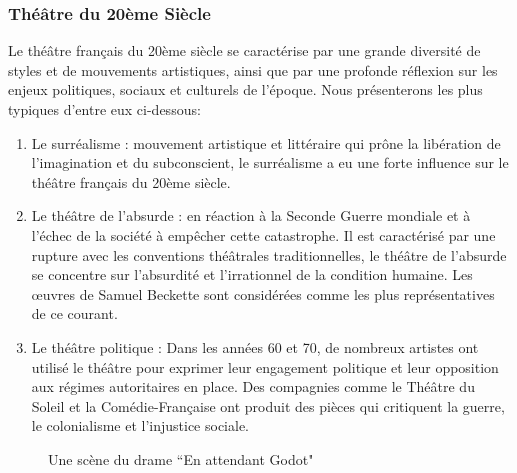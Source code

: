 \documentclass[UTF8,a4paper,12pt]{ctexart}
\numberwithin{equation}{section}
\newcommand{\mycite}[1]{\cite{#1}}
\begin{document}
\subsubsection{Théâtre du 20ème Siècle}
Le théâtre français du 20ème siècle se caractérise par une grande diversité de styles et de mouvements artistiques, ainsi que par une profonde réflexion sur les enjeux politiques, sociaux et culturels de l'époque. Nous présenterons les plus typiques d'entre eux ci-dessous:
\begin{enumerate}
\item Le surréalisme : mouvement artistique et littéraire qui prône la libération de l'imagination et du subconscient, le surréalisme a eu une forte influence sur le théâtre français du 20ème siècle.

\item Le théâtre de l'absurde : en réaction à la Seconde Guerre mondiale et à l'échec de la société à empêcher cette catastrophe. Il est caractérisé par une rupture avec les conventions théâtrales traditionnelles, le théâtre de l'absurde se concentre sur l'absurdité et l'irrationnel de la condition humaine. Les œuvres de Samuel Beckette sont considérées comme les plus représentatives de ce courant.

\item Le théâtre politique : Dans les années 60 et 70, de nombreux artistes ont utilisé le théâtre pour exprimer leur engagement politique et leur opposition aux régimes autoritaires en place\mycite{bradby1990theatre}. Des compagnies comme le Théâtre du Soleil et la Comédie-Française ont produit des pièces qui critiquent la guerre, le colonialisme et l'injustice sociale.
\end{enumerate}
\begin{figure}[htb] 
\caption{Une scène du drame ``En attendant Godot"}
\end{figure}
\end{document}
